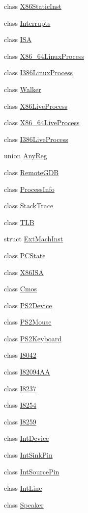 \begin{DoxyCompactItemize}
class \hyperlink{classX86ISA_1_1X86StaticInst}{X86StaticInst}
\item 
class \hyperlink{classX86ISA_1_1Interrupts}{Interrupts}
\item 
class \hyperlink{classX86ISA_1_1ISA}{ISA}
\item 
class \hyperlink{classX86ISA_1_1X86__64LinuxProcess}{X86\_\-64LinuxProcess}
\item 
class \hyperlink{classX86ISA_1_1I386LinuxProcess}{I386LinuxProcess}
\item 
class \hyperlink{classX86ISA_1_1Walker}{Walker}
\item 
class \hyperlink{classX86ISA_1_1X86LiveProcess}{X86LiveProcess}
\item 
class \hyperlink{classX86ISA_1_1X86__64LiveProcess}{X86\_\-64LiveProcess}
\item 
class \hyperlink{classX86ISA_1_1I386LiveProcess}{I386LiveProcess}
\item 
union \hyperlink{unionX86ISA_1_1AnyReg}{AnyReg}
\item 
class \hyperlink{classX86ISA_1_1RemoteGDB}{RemoteGDB}
\item 
class \hyperlink{classX86ISA_1_1ProcessInfo}{ProcessInfo}
\item 
class \hyperlink{classX86ISA_1_1StackTrace}{StackTrace}
\item 
class \hyperlink{classX86ISA_1_1TLB}{TLB}
\item 
struct \hyperlink{structX86ISA_1_1ExtMachInst}{ExtMachInst}
\item 
class \hyperlink{classX86ISA_1_1PCState}{PCState}
\item 
class \hyperlink{classX86ISA_1_1X86ISA}{X86ISA}
\item 
class \hyperlink{classX86ISA_1_1Cmos}{Cmos}
\item 
class \hyperlink{classX86ISA_1_1PS2Device}{PS2Device}
\item 
class \hyperlink{classX86ISA_1_1PS2Mouse}{PS2Mouse}
\item 
class \hyperlink{classX86ISA_1_1PS2Keyboard}{PS2Keyboard}
\item 
class \hyperlink{classX86ISA_1_1I8042}{I8042}
\item 
class \hyperlink{classX86ISA_1_1I82094AA}{I82094AA}
\item 
class \hyperlink{classX86ISA_1_1I8237}{I8237}
\item 
class \hyperlink{classX86ISA_1_1I8254}{I8254}
\item 
class \hyperlink{classX86ISA_1_1I8259}{I8259}
\item 
class \hyperlink{classX86ISA_1_1IntDevice}{IntDevice}
\item 
class \hyperlink{classX86ISA_1_1IntSinkPin}{IntSinkPin}
\item 
class \hyperlink{classX86ISA_1_1IntSourcePin}{IntSourcePin}
\item 
class \hyperlink{classX86ISA_1_1IntLine}{IntLine}
\item 
class \hyperlink{classX86ISA_1_1Speaker}{Speaker}
\end{DoxyCompactItemize}
